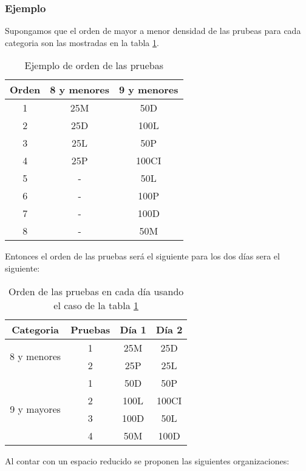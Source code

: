 \subsubsection{Ejemplo}
Supongamos que el orden de mayor a menor densidad de las prubeas para cada categoria son las mostradas en la tabla \ref{table:orden_example}.
\begin{table}[H]
    \centering
    \begin{tabular}{ccc}
        \hline
        Orden & 8 y menores & 9 y menores \\ \hline
        1     & 25M         & 50D         \\
        2     & 25D         & 100L        \\
        3     & 25L         & 50P         \\
        4     & 25P         & 100CI       \\
        5     & -           & 50L         \\
        6     & -           & 100P        \\
        7     & -           & 100D        \\
        8     & -           & 50M         \\ \hline
    \end{tabular}
    \caption{Ejemplo de orden de las pruebas}
    \label{table:orden_example}
\end{table}
Entonces el orden de las pruebas será el siguiente para los dos días sera el siguiente:
\begin{table}[H]
    \centering
    \begin{tabular}{cccc}
        \hline
        Categoria                    & Pruebas & Día 1 & Día 2 \\ \hline
        \multirow{2}{*}{8 y menores} & 1       & 25M   & 25D   \\
                                     & 2       & 25P   & 25L   \\ \hline
        \multirow{4}{*}{9 y mayores} & 1       & 50D   & 50P   \\
                                     & 2       & 100L  & 100CI \\
                                     & 3       & 100D  & 50L   \\
                                     & 4       & 50M   & 100D  \\ \hline
    \end{tabular}
    \caption{Orden de las pruebas en cada día usando el caso de la tabla \ref{table:orden_example}}
\end{table}
Al contar con un espacio reducido se proponen las siguientes organizaciones:



